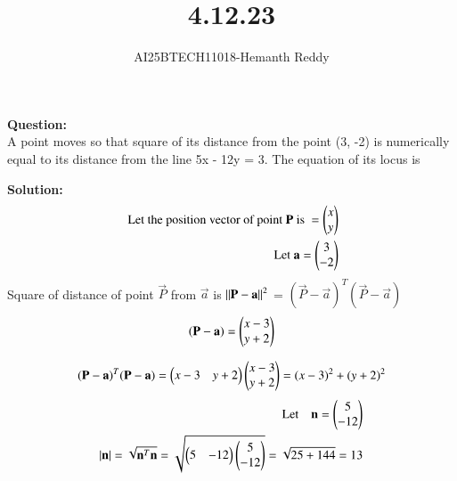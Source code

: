 \documentclass[journal]{IEEEtran}
\begin{document}

\vspace{3cm}

\title{4.12.23}
\author{AI25BTECH11018-Hemanth Reddy}
 \maketitle
{\let\newpage\relax\maketitle}

\renewcommand{\thefigure}{\theenumi}
\renewcommand{\thetable}{\theenumi}
\setlength{\intextsep}{10pt} %


\renewcommand{\thetable}{\theenumi}

\textbf{Question:}\\


A point moves so that square of its distance from the point (3, -2) is numerically
equal to its distance from the line 5x - 12y = 3. The equation of its locus is


\textbf{Solution:}\\

\begin{align}
   \text{ Let the position vector of point }  \mathbf{P} \text{ is }
   = \begin{pmatrix} x \\ y\end{pmatrix} \\
  \text{  Let }\mathbf{a} = \begin{pmatrix} 3 \\ -2\end{pmatrix} 
\end{align}
Square of distance of point $\vec{P}$ from $\vec{a}$ is $\left\lVert\mathbf{P} -\mathbf{a} \right\rVert^{2}$ = $(\vec{P} -\vec{a})^{T} (\vec{P} -\vec{a})$\\

\begin{align}
    (\mathbf{P} -\mathbf{a}) = \begin{pmatrix} x-3 \\ y+2\end{pmatrix} 
\end{align}

\begin{align}
    (\mathbf{P} -\mathbf{a})^{T}(\mathbf{P} -\mathbf{a})= \begin{pmatrix} x-3 & y+2\end{pmatrix}\begin{pmatrix} x-3 \\ y+2\end{pmatrix} = (x-3)^{2}+(y+2)^{2}
\end{align}
\begin{align}
     \text{Let} \quad \mathbf{n} = \begin{pmatrix} 5 \\-12\end{pmatrix}  \\
     |\textbf{n}| = \sqrt{\textbf{n}^T \textbf{n}} = \sqrt{\begin{pmatrix} 5 & -12\end{pmatrix} \begin{pmatrix} 5 \\-12\end{pmatrix}} = \sqrt{25+144} = 13 
\end{align}
\end{document}
